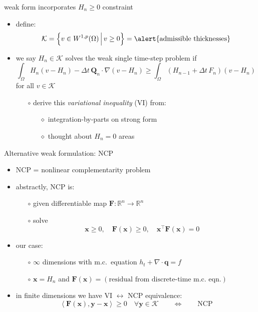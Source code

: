 \documentclass[xcolor={dvipsnames}]{beamer}
\newcommand\bq{\mathbf{q}}
\newcommand\bx{\mathbf{x}}
\newcommand\by{\mathbf{y}}
\newcommand\bF{\mathbf{F}}
\newcommand\bQ{\mathbf{Q}}
\newcommand\RR{\mathbb{R}}
\newcommand\Div{\nabla\cdot}
\newcommand\grad{\nabla}
\newcommand{\ip}[2]{\ensuremath{\left<#1,#2\right>}}
\begin{document}
\begin{frame}{weak form incorporates $H_n\ge 0$ constraint}

  \begin{itemize}
  \item define:
    $$\mathcal{K} = \left\{v \in W^{1,p}(\Omega) \,\Big|\, v\ge 0\right\} = \text{\alert{admissible thicknesses}}$$
  \item we say $H_n \in \mathcal{K}$ solves the \alert{weak single time-step problem} if
    $$\int_\Omega H_n (v - H_n) - \Delta t\, \bQ_n \cdot \grad(v - H_n) \ge \int_\Omega \left(H_{n-1} + \Delta t\, F_n\right) (v - H_n)$$
  for all $v \in \mathcal{K}$
  \small
  \medskip
    \begin{itemize}
    \item[$\circ$] derive this \emph{variational inequality} (VI) from:
      \begin{itemize}
      \item[$\diamond$] integration-by-parts on strong form
      \item[$\diamond$] thought about $H_n=0$ areas
      \end{itemize}
    \end{itemize}
  \end{itemize}
\end{frame}


\begin{frame}{Alternative weak formulation: NCP}

\begin{itemize}
\item NCP = nonlinear complementarity problem
\item abstractly, NCP is:
  \begin{itemize}
  \item[$\circ$]  given differentiable map $\bF:\RR^n \to \RR^n$
  \item[$\circ$]  solve
     $$\bx \ge 0, \quad \bF(\bx) \ge 0, \quad \bx^\top \bF(\bx) = 0$$
  \end{itemize}
\item our case:
  \begin{itemize}
  \item[$\circ$]  $\infty$ dimensions with m.c.~equation $h_t + \Div\bq = f$
  \item[$\circ$]  $\bx = H_n$ and $\bF(\bx) = (\text{residual from discrete-time m.c.~eqn.})$
  \end{itemize}
\item in finite dimensions we have VI $\leftrightarrow$ NCP equivalence:
  $$\ip{\bF(\bx)}{\by-\bx} \ge 0 \quad \forall \by \in \mathcal{K} \qquad \iff \qquad \text{NCP}$$
\end{itemize}
\end{frame}
\end{document}

